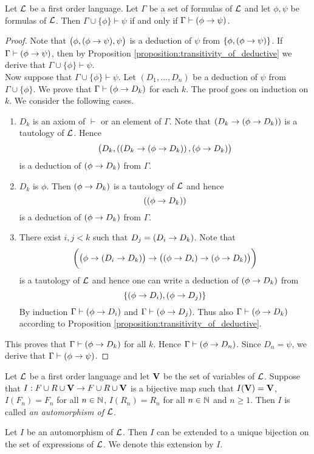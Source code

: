 \documentclass[10pt]{amsart}
\begin{document}
\begin{theorem}[Deduction]\label{theorem:deduction_theorem}
	Let ${\mathcal L}$ be a first order language. Let $\Gamma$ be a set of formulas of ${\mathcal L}$ and let $\phi, \psi$ be formulas of ${\mathcal L}$. Then $\Gamma \cup \{\phi\} \vdash \psi$ if and only if $\Gamma \vdash (\phi \rightarrow \psi)$.
\end{theorem}
\begin{proof}
	Note that $\big(\phi, (\phi \rightarrow \psi) , \psi\big)$ is a deduction of $\psi$ from $\{\phi, (\phi \rightarrow \psi)\}$. If $\Gamma \vdash (\phi \rightarrow \psi)$, then by Proposition \ref{proposition:transitivity_of_deductive} we derive that $\Gamma \cup \{\phi\} \vdash \psi$.\\
	Now suppose that $\Gamma \cup \{\phi\} \vdash \psi$. Let $(D_1 , ..., D_n)$ be a deduction of $\psi$ from $\Gamma \cup \{\phi\}$. We prove that $\Gamma \vdash (\phi \rightarrow D_k)$ for each $k$. The proof goes on induction on $k$. We consider the following cases.
	\begin{enumerate}[label=\textbf{(\arabic*)}, leftmargin=3.0em]
		\item $D_k$ is an axiom of $\vdash$ or an element of $\Gamma$. Note that $\left(D_k \rightarrow (\phi \rightarrow D_k )\right)$ is a tautology of ${\mathcal L}$. Hence
		      $$\big(D_k,\left((D_k \rightarrow (\phi \rightarrow D_k )\right),(\phi \rightarrow D_k )\big)$$
		      is a deduction of $(\phi \rightarrow D_k)$ from $\Gamma$.
		\item $D_k$ is $\phi$. Then $(\phi \rightarrow D_k)$ is a tautology of ${\mathcal L}$ and hence
		      $$\left((\phi \rightarrow D_k )\right)$$
		      is a deduction of $(\phi \rightarrow D_k)$ from $\Gamma$.
		\item There exist $i, j < k$ such that $D_j = (D_i \rightarrow D_k)$. Note that
		      $$\bigg(\big(\phi \rightarrow (D_i \rightarrow D_k)\big) \rightarrow \big((\phi \rightarrow D_i ) \rightarrow (\phi \rightarrow D_k)\big)\bigg)$$
		      is a tautology of ${\mathcal L}$ and hence one can write a deduction of $(\phi \rightarrow D_k)$ from
		      $$\{(\phi \rightarrow D_i),(\phi \rightarrow D_j)\}$$
		      By induction $\Gamma \vdash (\phi \rightarrow D_i)$ and $\Gamma \vdash (\phi \rightarrow D_j)$. Thus also $\Gamma \vdash (\phi \rightarrow D_k)$ according to Proposition \ref{proposition:transitivity_of_deductive}.
	\end{enumerate}
	This proves that $\Gamma \vdash (\phi \rightarrow D_k)$ for all $k$. Hence $\Gamma \vdash (\phi \rightarrow D_n)$. Since $D_n = \psi$, we derive that $\Gamma \vdash (\phi \rightarrow \psi)$.
\end{proof}

\begin{definition}
	Let ${\mathcal L}$ be a first order language and let $\mathbf{V}$ be the set of variables of ${\mathcal L}$. Suppose that $I:F\cup R \cup \mathbf{V}\rightarrow F \cup R \cup \mathbf{V}$ is a bijective map such that $I(\mathbf{V}) = \mathbf{V}$, $I(F_n) = F_n$ for all $n \in {\mathbb N}$, $I(R_n) = R_n$ for all $n \in {\mathbb N}$ and $n \geq 1$. Then $I$ is called \textit{an automorphism of ${\mathcal L}$}.
\end{definition}
\noindent
Let $I$ be an automorphism of ${\mathcal L}$. Then $I$ can be extended to a unique bijection on the set of expressions of ${\mathcal L}$. We denote this extension by $I$.
\end{document}
